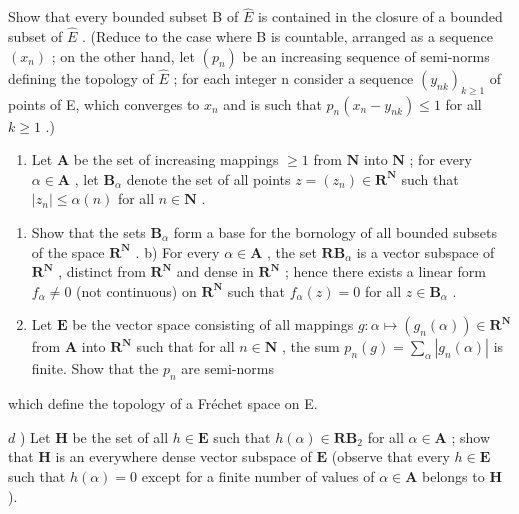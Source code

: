 Show that every bounded subset B of \(\hat{E}\) is contained in the closure of a bounded subset of \(\hat{E}\) . (Reduce to the case where B is countable, arranged as a sequence \((x_{n})\) ; on the other hand, let \((p_{n})\) be an increasing sequence of semi-norms defining the topology of \(\hat{E}\) ; for each integer n consider a sequence \((y_{nk})_{k\geqslant1}\) of points of E, which converges to \(x_{n}\) and is such that \(p_{n}(x_{n}-y_{nk})\leqslant1\) for all \(k\geqslant1\) .)

\begin{enumerate}
\def\labelenumi{\arabic{enumi})}
\setcounter{enumi}{16}
\tightlist
\item
  Let \(\mathbf{A}\) be the set of increasing mappings \(\geqslant 1\) from \(\mathbf{N}\) into \(\mathbf{N}\) ; for every \(\alpha \in \mathbf{A}\) , let \(\mathbf{B}_{\alpha}\) denote the set of all points \(z = (z_n) \in \mathbf{R}^{\mathbf{N}}\) such that \(|z_n| \leqslant \alpha(n)\) for all \(n \in \mathbf{N}\) .
\end{enumerate}

\begin{enumerate}
\def\labelenumi{\alph{enumi})}
\item
  Show that the sets \(\mathbf{B}_{\alpha}\) form a base for the bornology of all bounded subsets of the space \(\mathbf{R}^{\mathbf{N}}\) . b) For every \(\alpha \in \mathbf{A}\) , the set \(\mathbf{RB}_{\alpha}\) is a vector subspace of \(\mathbf{R}^{\mathbf{N}}\) , distinct from \(\mathbf{R}^{\mathbf{N}}\) and dense in \(\mathbf{R}^{\mathbf{N}}\) ; hence there exists a linear form \(f_{\alpha} \neq 0\) (not continuous) on \(\mathbf{R}^{\mathbf{N}}\) such that \(f_{\alpha}(z) = 0\) for all \(z \in \mathbf{B}_{\alpha}\) .
\item
  Let \(\mathbf{E}\) be the vector space consisting of all mappings \(g: \alpha \mapsto (g_n(\alpha)) \in \mathbf{R}^{\mathbf{N}}\) from \(\mathbf{A}\) into \(\mathbf{R}^{\mathbf{N}}\) such that for all \(n \in \mathbf{N}\) , the sum \(p_n(g) = \sum_{\alpha} |g_n(\alpha)|\) is finite. Show that the \(p_n\) are semi-norms
\end{enumerate}

which define the topology of a Fréchet space on E.

\(d\) ) Let \(\mathbf{H}\) be the set of all \(h\in \mathbf{E}\) such that \(h(\alpha)\in \mathbf{RB}_2\) for all \(\alpha \in \mathbf{A}\) ; show that \(\mathbf{H}\) is an everywhere dense vector subspace of \(\mathbf{E}\) (observe that every \(h\in \mathbf{E}\) such that \(h(\alpha) = 0\) except for a finite number of values of \(\alpha \in \mathbf{A}\) belongs to \(\mathbf{H}\) ).

